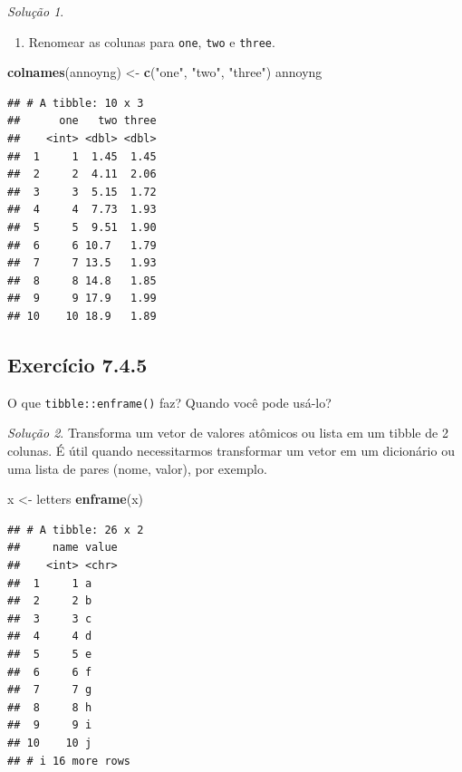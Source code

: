\documentclass[
]{latex/krantz}
\newenvironment{Shaded}{\begin{snugshade}}{\end{snugshade}}
\newcommand{\FunctionTok}[1]{\textcolor[rgb]{0.13,0.29,0.53}{\textbf{#1}}}
\newcommand{\NormalTok}[1]{#1}
\newcommand{\OtherTok}[1]{\textcolor[rgb]{0.56,0.35,0.01}{#1}}
\newcommand{\StringTok}[1]{\textcolor[rgb]{0.31,0.60,0.02}{#1}}
\providecommand{\tightlist}{%
  \setlength{\itemsep}{0pt}\setlength{\parskip}{0pt}}
\theoremstyle{definition}
\theoremstyle{definition}
\theoremstyle{definition}
\theoremstyle{definition}
\theoremstyle{remark}
\newtheorem*{solution}{Solução}
\begin{document}
\begin{solution}
\begin{enumerate}
\def\labelenumi{\alph{enumi}.}
\setcounter{enumi}{3}
\tightlist
\item
  Renomear as colunas para \texttt{one}, \texttt{two} e \texttt{three}.
\end{enumerate}

\begin{Shaded}
\begin{Highlighting}[]
\FunctionTok{colnames}\NormalTok{(annoyng) }\OtherTok{\textless{}{-}} \FunctionTok{c}\NormalTok{(}\StringTok{"one"}\NormalTok{, }\StringTok{"two"}\NormalTok{, }\StringTok{"three"}\NormalTok{)}
\NormalTok{annoyng}
\end{Highlighting}
\end{Shaded}

\begin{verbatim}
## # A tibble: 10 x 3
##      one   two three
##    <int> <dbl> <dbl>
##  1     1  1.45  1.45
##  2     2  4.11  2.06
##  3     3  5.15  1.72
##  4     4  7.73  1.93
##  5     5  9.51  1.90
##  6     6 10.7   1.79
##  7     7 13.5   1.93
##  8     8 14.8   1.85
##  9     9 17.9   1.99
## 10    10 18.9   1.89
\end{verbatim}

\end{solution}

\hypertarget{exr7-4-5}{%
\subsection*{Exercício 7.4.5}\label{exr7-4-5}}

O que \texttt{tibble::enframe()} faz? Quando você pode usá-lo?

\begin{solution}

Transforma um vetor de valores atômicos ou lista em um tibble de 2 colunas. É útil quando necessitarmos transformar um vetor em um dicionário ou uma lista de pares (nome, valor), por exemplo.

\begin{Shaded}
\begin{Highlighting}[]
\NormalTok{x }\OtherTok{\textless{}{-}}\NormalTok{ letters}
\FunctionTok{enframe}\NormalTok{(x)}
\end{Highlighting}
\end{Shaded}

\begin{verbatim}
## # A tibble: 26 x 2
##     name value
##    <int> <chr>
##  1     1 a    
##  2     2 b    
##  3     3 c    
##  4     4 d    
##  5     5 e    
##  6     6 f    
##  7     7 g    
##  8     8 h    
##  9     9 i    
## 10    10 j    
## # i 16 more rows
\end{verbatim}

\end{solution}
\end{document}
